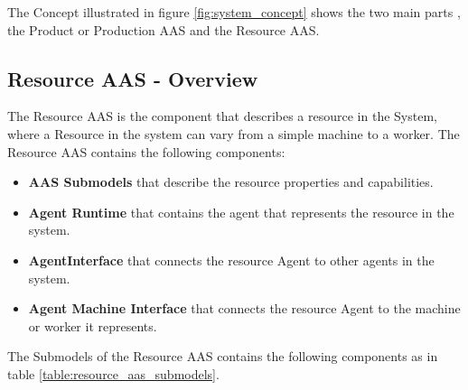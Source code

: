 The Concept illustrated in figure \ref{fig:system_concept} shows the two main parts , the Product or Production AAS and the Resource AAS.

\subsection{Resource AAS - Overview}
The Resource AAS is the component that describes a resource in the System,
where a Resource in the system can vary from a simple machine to a worker.
The Resource AAS contains the following components:
\begin{itemize}
    \item \textbf{AAS Submodels} that describe the resource properties and capabilities.
    \item \textbf{Agent Runtime} that contains the agent that represents the resource in the system.
    \item \textbf{AgentInterface} that connects the resource Agent to other agents in the system.
    \item \textbf{Agent Machine Interface} that connects the resource Agent to the machine or worker it represents.
\end{itemize}

The Submodels of the Resource AAS contains the following components as in table \ref{table:resource_aas_submodels}.

